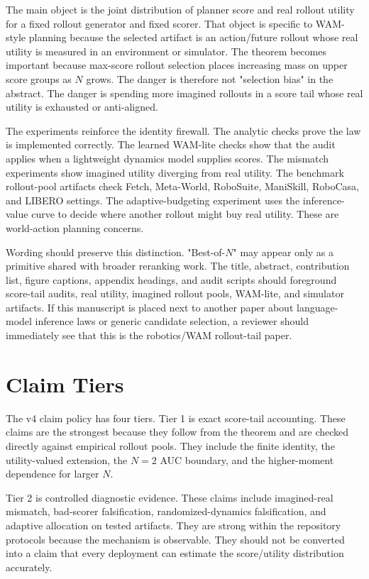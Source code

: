 The main object is the joint distribution of planner score and real rollout
utility for a fixed rollout generator and fixed scorer. That object is specific
to WAM-style planning because the selected artifact is an action/future rollout
whose real utility is measured in an environment or simulator. The theorem
becomes important because max-score rollout selection places increasing mass
on upper score groups as $N$ grows. The danger is therefore not "selection bias"
in the abstract. The danger is spending more imagined rollouts in a score tail
whose real utility is exhausted or anti-aligned.

The experiments reinforce the identity firewall. The analytic checks prove the
law is implemented correctly. The learned WAM-lite checks show that the audit
applies when a lightweight dynamics model supplies scores. The mismatch
experiments show imagined utility diverging from real utility. The benchmark
rollout-pool artifacts check Fetch, Meta-World, RoboSuite, ManiSkill,
RoboCasa, and LIBERO settings. The adaptive-budgeting experiment uses the
inference-value curve to decide where another rollout might buy real utility.
These are world-action planning concerns.

Wording should preserve this distinction. "Best-of-$N$" may appear only as a
primitive shared with broader reranking work. The title, abstract, contribution
list, figure captions, appendix headings, and audit scripts should foreground
score-tail audits, real utility, imagined rollout pools, WAM-lite, and
simulator artifacts. If this manuscript is placed next to another paper about
language-model inference laws or generic candidate selection, a reviewer should
immediately see that this is the robotics/WAM rollout-tail paper.

\section{Claim Tiers}
\label{app:claim-tiers}

The v4 claim policy has four tiers. Tier 1 is exact score-tail accounting.
These claims are the strongest because they follow from the theorem and are
checked directly against empirical rollout pools. They include the finite
identity, the utility-valued extension, the $N=2$ AUC boundary, and the
higher-moment dependence for larger $N$.

Tier 2 is controlled diagnostic evidence. These claims include imagined-real
mismatch, bad-scorer falsification, randomized-dynamics falsification, and
adaptive allocation on tested artifacts. They are strong within the repository
protocols because the mechanism is observable. They should not be converted
into a claim that every deployment can estimate the score/utility distribution
accurately.

